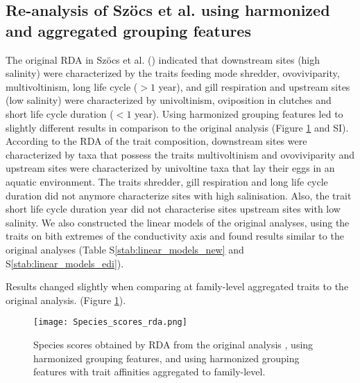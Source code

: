 \documentclass[../Draft_harmonization_paper.tex]{subfiles}
\begin{document}

\subsection*{Re-analysis of Szöcs et al. using harmonized and aggregated grouping features}

The original RDA in Szöcs et al. (\cite{szocs_effects_2014}) indicated that downstream sites (high salinity) were characterized by the traits feeding mode shredder, ovoviviparity, multivoltinism, long life cycle ($> 1$ year), and gill respiration and upstream sites (low salinity) were characterized by univoltinism, oviposition in clutches and short life cycle duration ($< 1$ year). Using harmonized grouping features led to slightly different results in comparison to the original analysis (Figure \ref{fig:rda_species_scores} and SI). According to the RDA of the trait composition, downstream sites were characterized by taxa that possess the traits multivoltinism and ovoviviparity and upstream sites were characterized by univoltine taxa that lay their eggs in an aquatic environment. The traits shredder, gill respiration and long life cycle duration did not anymore characterize sites with high salinisation. Also, the trait short life cycle duration year did not characterise sites upstream sites with low salinity.%
We also constructed the linear models of the original analyses, using the traits on bith extremes of the conductivity axis and found results similar to the original analyses (Table S\ref{stab:linear_models_new} and S\ref{stab:linear_models_edi}).

Results changed slightly when comparing at family-level aggregated traits to the original analysis. (Figure \ref{fig:rda_species_scores}). 



\begin{figure}[H]
    \label{fig:rda_species_scores}
    \centering
    \texttt{[image: Species\_scores\_rda.png]}
    \caption{Species scores obtained by RDA from the original analysis \cite{szocs_effects_2014}, using harmonized grouping features, and using harmonized grouping features with trait affinities aggregated to family-level.}
    \label{fig:rda_species_scores}
\end{figure}
\end{document}
